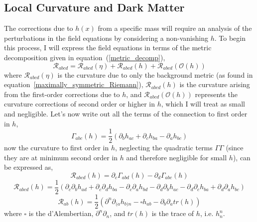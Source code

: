 \documentclass[aps,prd,preprint]{revtex4-1}
\begin{document}
\subsection*{Local Curvature and Dark Matter}
The corrections due to $h(x)$ from a specific mass will require an analysis of the perturbations in the field equations by considering a non-vanishing $h$. To begin this process, I will express the field equations in terms of the metric decomposition given in equation~(\ref{metric_decomp}),
\begin{equation}\label{pertubation_of_Riemann}
    \mathcal{R}_{abcd} = \mathcal{R}_{abcd}(\eta) + \mathcal{R}_{abcd}(h) + \mathcal{R}_{abcd}(\mathcal{O}(h))
\end{equation}
where $\mathcal{R}_{abcd}(\eta)$ is the curvature due to only the background metric (as found in equation~\ref{maximally_symmetric_Riemann}), $\mathcal{R}_{abcd}(h)$ is the curvature arising from the first-order corrections due to $h$, and $\mathcal{R}_{abcd}(\mathcal{O}(h))$ represents the curvature corrections of second order or higher in $h$, which I will treat as small and negligible. Let's now write out all the terms of the connection to first order in $h$,
\begin{equation}
    \Gamma_{abc}(h) = \frac{1}{2}\left( \partial_{b}h_{ac} + \partial_{c}h_{ba} - \partial_{a}h_{bc} \right)
\end{equation}
now the curvature to first order in $h$, neglecting the quadratic terms $\Gamma\Gamma$ (since they are at minimum second order in $h$ and therefore negligible for small $h$), can be expressed as,
\begin{equation*}
    \mathcal{R}_{abcd}(h) = \partial_c \Gamma_{abd}(h) - \partial_d \Gamma_{abc}(h)
\end{equation*}
\begin{equation}\label{first_order_pertubation_Riemann}
    \mathcal{R}_{abcd}(h) = \frac{1}{2} \left( \partial_c\partial_{b}h_{ad} + \partial_c\partial_{d}h_{ba} - \partial_c\partial_{a}h_{bd} - \partial_d\partial_{b}h_{ac} - \partial_d\partial_{c}h_{ba} + \partial_d\partial_{a}h_{bc} \right)
\end{equation}
\begin{equation}\label{first_order_pertubation_Ricci}
    \mathcal{R}_{ab}(h) = \frac{1}{2} \left( \partial^n\partial_{(a}h_{b)n} - \square h_{ab} - \partial_b\partial_{a}tr(h) \right)
\end{equation}
where $\square$ is the d'Alembertian, $\partial^n\partial_n$, and $tr(h)$ is the trace of $h$, i.e. $h^n_n$.
\end{document}
